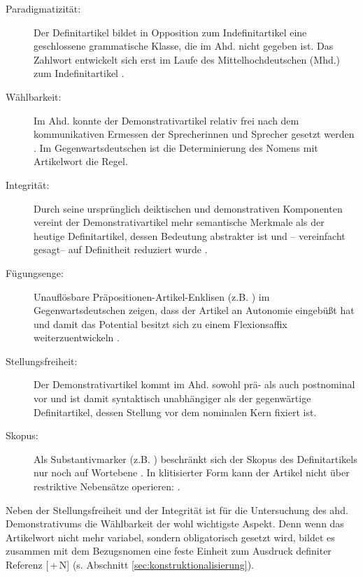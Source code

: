 \begin{description}
\item[Paradigmatizität:] Der Definitartikel bildet in Opposition zum Indefinitartikel eine geschlossene grammatische Klasse, die im Ahd. nicht gegeben ist. Das Zahlwort  entwickelt sich erst im Laufe des Mittelhochdeutschen (Mhd.) zum Indefinitartikel \parencite{Szczepaniak2016}. 
\item[Wählbarkeit:] Im Ahd. konnte der Demonstrativartikel relativ frei nach dem kommunikativen Ermessen der Sprecherinnen und Sprecher gesetzt werden \parencite{Oubouzar1992}. Im Gegenwartsdeutschen ist die Determinierung des Nomens mit Artikelwort die Regel. 
\item[Integrität:] Durch seine ursprünglich deiktischen und demonstrativen Komponenten vereint der Demonstrativartikel mehr semantische Merkmale als der heutige Definitartikel, dessen Bedeutung abstrakter ist und -- vereinfacht gesagt-- auf Definitheit reduziert wurde \parencite[41]{Lehmann2015}.
\item[Fügungsenge:] Unauflösbare Präpositionen-Artikel-Enklisen (z.B. ) im Gegenwartsdeutschen zeigen, dass der Artikel an Autonomie eingebüßt hat und damit das Potential besitzt sich zu einem Flexionsaffix weiterzuentwickeln \parencite[s. hierzu][]{Nubling1992,Nubling2005}.  
\item[Stellungsfreiheit:] Der Demonstrativartikel kommt im Ahd. sowohl prä- als auch postnominal vor \parencite[27-28]{Schrodt2004} und ist damit syntaktisch unabhängiger als der gegenwärtige Definitartikel, dessen Stellung vor dem nominalen Kern fixiert ist. 
\item[Skopus:] Als Substantivmarker (z.B. ) beschränkt sich der Skopus des Definitartikels nur noch auf Wortebene \parencite[71]{Szczepaniak2011a}. In klitisierter Form kann der Artikel nicht über restriktive Nebensätze operieren:  \parencite[112]{Nubling2005}.
\end{description}

\noindent
Neben der Stellungsfreiheit und der Integrität ist für die Untersuchung des ahd. Demonstrativums die Wählbarkeit der wohl wichtigste Aspekt. Denn wenn das Artikelwort nicht mehr variabel, sondern obligatorisch gesetzt wird, bildet es zusammen mit dem Bezugsnomen eine feste Einheit zum Ausdruck definiter Referenz [\,+\,N] (s. Abschnitt \ref{sec:konstruktionalisierung}). 

